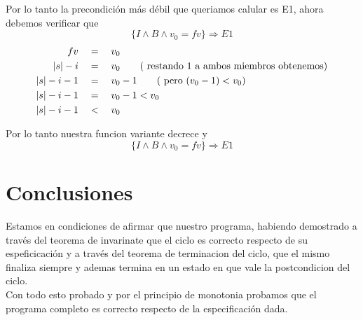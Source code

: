 \documentclass[12pt]{book}
\begin{document}
Por lo tanto la precondici\'on m\'as d\'ebil que queriamos calular es E1, ahora debemos verificar que 
\[ \{ I \wedge B \wedge v_0 = fv \}  \Rightarrow E1 \]
\begin{align*}
fv \quad &= \quad  v_0   \\
|s|-i \quad &= \quad  v_0   \qquad (\text{ restando 1 a ambos miembros obtenemos}) \\
|s|-i -1 \quad &= \quad  v_0  -1 \qquad (\text{ pero $ (v_0-1) < v_0$}) \\
|s|-i -1 \quad &= \quad  v_0  -1 < v_0\\
|s|-i -1 \quad &< \quad  v_0
\end{align*}

\begin{shaded}
Por lo tanto nuestra funcion variante decrece y \[ \{ I \wedge B \wedge v_0 = fv \}  \Rightarrow E1 \]
\end{shaded}

\chapter{Conclusiones}
Estamos en condiciones de afirmar que nuestro programa, habiendo demostrado a través del teorema de invarinate que el ciclo es correcto respecto de su espeficicaci\'on y a través del teorema de terminacion del ciclo, que el mismo finaliza siempre y ademas termina en un estado en que vale la postcondicion del ciclo. \\
Con todo esto probado y por el principio de monotonia probamos que el programa completo es correcto respecto de la especificaci\'on dada.
\end{document}
